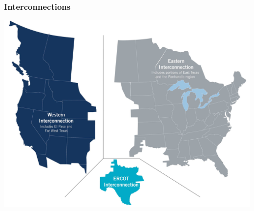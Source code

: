 \documentclass[14pt, unknownkeysallowed]{beamer}
\begin{document}
\begin{frame}
\frametitle{Interconnections}
\begin{center}
\includegraphics[height=.8\textheight]{InternconnectionBranded} %
\end{center}

\end{frame}
\end{document}
